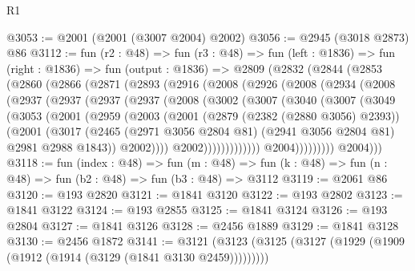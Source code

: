 \begin{lexlean}{R1}
\begin{coremodule}
@3053 := @2001 (@2001 (@3007 @2004) @2002)
@3056 := @2945 (@3018 @2873) @86
@3112 := fun (r2 : @48) =>
  fun (r3 : @48) =>
  fun (left : @1836) =>
  fun (right : @1836) =>
  fun (output : @1836) =>
  @2809
    (@2832
      (@2844
        (@2853
          (@2860
            (@2866
              (@2871
                (@2893
                  (@2916
                    (@2008
                      (@2926
                        (@2008
                          (@2934
                            (@2008
                              (@2937
                                (@2937
                                  (@2937
                                    (@2937
                                      (@2008
                                        (@3002
                                          (@3007
                                            (@3040
                                              (@3007
                                                (@3049
                                                  (@3053
                                                    (@2001
                                                      (@2959
                                                        (@2003
                                                          (@2001
                                                            (@2879 (@2382 (@2880 @3056) @2393))
                                                            (@2001
                                                              (@3017
                                                                (@2465
                                                                  (@2971 @3056 @2804 @81)
                                                                  (@2941 @3056 @2804 @81)
                                                                  @2981
                                                                  @2988
                                                                  @1843))
                                                              @2002))))
                                                      @2002)))))))))))))
                            @2004)))))))))
          @2004)))
@3118 := fun (index : @48) =>
  fun (m : @48) => fun (k : @48) => fun (n : @48) => fun (b2 : @48) => fun (b3 : @48) => @3112
@3119 := @2061 @86
@3120 := @193 @2820
@3121 := @1841 @3120
@3122 := @193 @2802
@3123 := @1841 @3122
@3124 := @193 @2855
@3125 := @1841 @3124
@3126 := @193 @2804
@3127 := @1841 @3126
@3128 := @2456 @1889
@3129 := @1841 @3128
@3130 := @2456 @1872
@3141 := @3121 (@3123 (@3125 (@3127 (@1929 (@1909 (@1912 (@1914 (@3129 (@1841 @3130 @2459)))))))))

\end{coremodule}
\end{lexlean}
